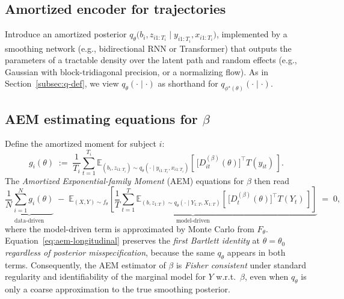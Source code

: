 \subsection{Amortized encoder for trajectories}
Introduce an amortized posterior 
\(q_\theta\big(b_i,z_{i1:T_i}\mid y_{i1:T_i},x_{i1:T_i}\big)\), 
implemented by a smoothing network (e.g., bidirectional RNN or Transformer) 
that outputs the parameters of a tractable density over the latent path and 
random effects (e.g., Gaussian with block-tridiagonal precision, or a normalizing flow). 
As in Section~\ref{subsec:q-def}, we view \(q_\theta(\cdot\mid\cdot)\) as shorthand for 
\(q_{\phi^\star(\theta)}(\cdot\mid\cdot)\).

\subsection{AEM estimating equations for \texorpdfstring{$\beta$}{beta}}
Define the amortized moment for subject \(i\):
\[
g_i(\theta)\;:=\;\frac{1}{T_i}\sum_{t=1}^{T_i}
\mathbb{E}_{(b_i,z_{i1:T_i})\sim q_\theta(\cdot\mid y_{i1:T_i},x_{i1:T_i})}
\!\left[\,
\big[D_{it}^{(\beta)}(\theta)\big]^\top T(y_{it})
\,\right].
\]
The \emph{Amortized Exponential-family Moment} (AEM) equations for \(\beta\) then read
\begin{equation}
\label{eq:aem-longitudinal}
\underbrace{\frac{1}{N}\sum_{i=1}^N g_i(\theta)}_{\text{data-driven}}
\;-\;
\underbrace{\mathbb{E}_{(X,Y)\sim f_\theta}\!\left[
\frac{1}{T}\sum_{t=1}^{T}
\mathbb{E}_{(b,z_{1:T})\sim q_\theta(\cdot\mid Y_{1:T},X_{1:T})}
\!\left[\,
\big[D_{t}^{(\beta)}(\theta)\big]^\top T(Y_t)
\,\right]\right]}_{\text{model-driven}}
\;=\;0,
\end{equation}
where the model-driven term is approximated by Monte Carlo from \(F_\theta\). 
Equation~\eqref{eq:aem-longitudinal} preserves the \emph{first Bartlett identity} at \(\theta=\theta_0\) \emph{regardless of posterior misspecification}, 
because the same \(q_\theta\) appears in both terms. 
Consequently, the AEM estimator of \(\beta\) is \emph{Fisher consistent} under standard 
regularity and identifiability of the marginal model for \(Y\) w.r.t.\ \(\beta\), 
even when \(q_\theta\) is only a coarse approximation to the true smoothing posterior.

